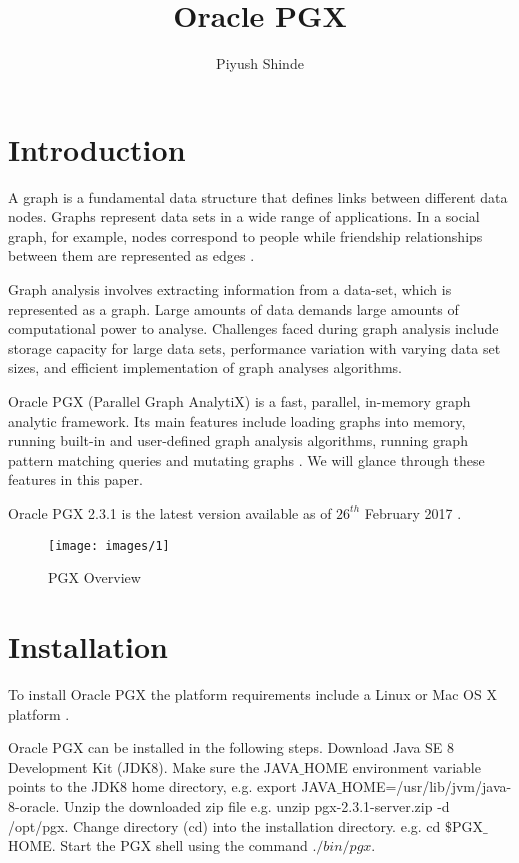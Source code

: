 \documentclass[9pt,twocolumn,twoside]{../../styles/osajnl}
\title{Oracle PGX}
\author[1,*]{Piyush Shinde}
\affil[1]{School of Informatics and Computing, Bloomington, IN 47408, U.S.A.}
\affil[*]{Corresponding authors: piyushsshinde1992@gmail.com}
\begin{document}
\maketitle

\section{Introduction}

A graph is a fundamental data structure that defines links between different data nodes. Graphs represent data sets in a wide range of applications. In a social graph, for example, nodes correspond to people while friendship relationships between them are represented as edges \cite{hong2012green}.

Graph analysis involves extracting information from a data-set, which is represented as a graph. Large amounts of data demands large amounts of computational power to analyse. Challenges faced during graph analysis include storage capacity for large data sets, performance variation with varying data set sizes, and efficient implementation of graph analyses algorithms.

Oracle PGX (Parallel Graph AnalytiX) is a fast, parallel, in-memory graph analytic framework. Its main features include loading graphs into memory, running built-in and user-defined graph analysis algorithms, running graph pattern matching queries and mutating graphs \cite{www-over}. We will glance through these features in this paper.

Oracle PGX 2.3.1 is the latest version available as of $26^{th}$ February 2017 \cite{www-plat}.

\begin{figure}[h]
    \centering
    \texttt{[image: images/1]}
    \centering
    \caption{PGX Overview \cite{www-over}}
    \end{figure}

\section{Installation}

To install Oracle PGX the platform requirements include a Linux or Mac OS X platform \cite{www-plat}. 

Oracle PGX can be installed in the following steps. Download Java SE 8 Development Kit (JDK8). Make sure the JAVA$\_$HOME environment variable points to the JDK8 home directory, e.g. export JAVA$\_$HOME=/usr/lib/jvm/java-8-oracle. Unzip the downloaded zip file e.g. unzip pgx-2.3.1-server.zip -d /opt/pgx. Change directory (cd) into the installation directory. e.g. cd $\$$PGX$\_$HOME. Start the PGX shell using the command $./bin/pgx$.
\end{document}
